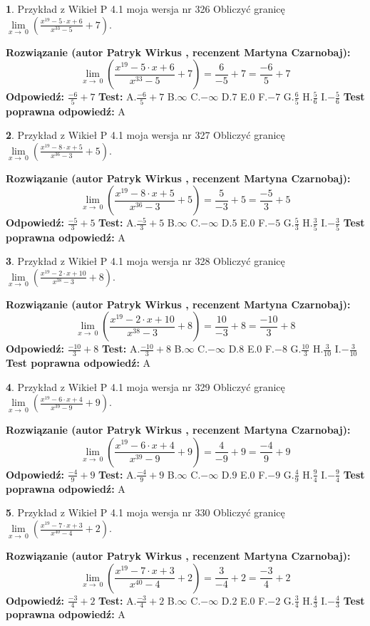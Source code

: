 \documentclass[12pt, a4paper]{article}
\theoremstyle{definition} %
\newtheorem{zad}{}
\newcommand{\zadStart}[1]{\begin{zad}#1\newline}
\newcommand{\zadStop}{\end{zad}}
\newcommand{\rozwStart}[2]{\noindent \textbf{Rozwiązanie (autor #1 , recenzent #2): }\newline}
\newcommand{\rozwStop}{\newline}
\newcommand{\odpStart}{\noindent \textbf{Odpowiedź:}\newline}
\newcommand{\odpStop}{\newline}
\newcommand{\testStart}{\noindent \textbf{Test:}\newline}
\newcommand{\testStop}{\newline}
\newcommand{\kluczStart}{\noindent \textbf{Test poprawna odpowiedź:}\newline}
\newcommand{\kluczStop}{\newline}
\begin{document}
\zadStart{Przykład z Wikieł P 4.1 moja wersja nr 326}
Obliczyć granicę $\lim\limits_{x\to\ 0}(\frac{x^{19}-5 \cdot x +6}{x^{33}-5}+7)$.
\zadStop
\rozwStart{Patryk Wirkus}{Martyna Czarnobaj}
$$\lim\limits_{x\to\ 0}(\frac{x^{19}-5 \cdot x +6}{x^{33}-5}+7)=\frac{6}{-5}+7=\frac{-6}{5}+7$$
\rozwStop
\odpStart
$\frac{-6}{5}+7$
\odpStop
\testStart
A.$\frac{-6}{5}+7$
B.$\infty$
C.$-\infty$
D.$7$
E.$0$
F.$-7$
G.$\frac{6}{5}$
H.$\frac{5}{6}$
I.$-\frac{5}{6}$
\testStop
\kluczStart
A
\kluczStop



\zadStart{Przykład z Wikieł P 4.1 moja wersja nr 327}
Obliczyć granicę $\lim\limits_{x\to\ 0}(\frac{x^{19}-8 \cdot x +5}{x^{36}-3}+5)$.
\zadStop
\rozwStart{Patryk Wirkus}{Martyna Czarnobaj}
$$\lim\limits_{x\to\ 0}(\frac{x^{19}-8 \cdot x +5}{x^{36}-3}+5)=\frac{5}{-3}+5=\frac{-5}{3}+5$$
\rozwStop
\odpStart
$\frac{-5}{3}+5$
\odpStop
\testStart
A.$\frac{-5}{3}+5$
B.$\infty$
C.$-\infty$
D.$5$
E.$0$
F.$-5$
G.$\frac{5}{3}$
H.$\frac{3}{5}$
I.$-\frac{3}{5}$
\testStop
\kluczStart
A
\kluczStop



\zadStart{Przykład z Wikieł P 4.1 moja wersja nr 328}
Obliczyć granicę $\lim\limits_{x\to\ 0}(\frac{x^{19}-2 \cdot x +10}{x^{38}-3}+8)$.
\zadStop
\rozwStart{Patryk Wirkus}{Martyna Czarnobaj}
$$\lim\limits_{x\to\ 0}(\frac{x^{19}-2 \cdot x +10}{x^{38}-3}+8)=\frac{10}{-3}+8=\frac{-10}{3}+8$$
\rozwStop
\odpStart
$\frac{-10}{3}+8$
\odpStop
\testStart
A.$\frac{-10}{3}+8$
B.$\infty$
C.$-\infty$
D.$8$
E.$0$
F.$-8$
G.$\frac{10}{3}$
H.$\frac{3}{10}$
I.$-\frac{3}{10}$
\testStop
\kluczStart
A
\kluczStop



\zadStart{Przykład z Wikieł P 4.1 moja wersja nr 329}
Obliczyć granicę $\lim\limits_{x\to\ 0}(\frac{x^{19}-6 \cdot x +4}{x^{39}-9}+9)$.
\zadStop
\rozwStart{Patryk Wirkus}{Martyna Czarnobaj}
$$\lim\limits_{x\to\ 0}(\frac{x^{19}-6 \cdot x +4}{x^{39}-9}+9)=\frac{4}{-9}+9=\frac{-4}{9}+9$$
\rozwStop
\odpStart
$\frac{-4}{9}+9$
\odpStop
\testStart
A.$\frac{-4}{9}+9$
B.$\infty$
C.$-\infty$
D.$9$
E.$0$
F.$-9$
G.$\frac{4}{9}$
H.$\frac{9}{4}$
I.$-\frac{9}{4}$
\testStop
\kluczStart
A
\kluczStop



\zadStart{Przykład z Wikieł P 4.1 moja wersja nr 330}
Obliczyć granicę $\lim\limits_{x\to\ 0}(\frac{x^{19}-7 \cdot x +3}{x^{40}-4}+2)$.
\zadStop
\rozwStart{Patryk Wirkus}{Martyna Czarnobaj}
$$\lim\limits_{x\to\ 0}(\frac{x^{19}-7 \cdot x +3}{x^{40}-4}+2)=\frac{3}{-4}+2=\frac{-3}{4}+2$$
\rozwStop
\odpStart
$\frac{-3}{4}+2$
\odpStop
\testStart
A.$\frac{-3}{4}+2$
B.$\infty$
C.$-\infty$
D.$2$
E.$0$
F.$-2$
G.$\frac{3}{4}$
H.$\frac{4}{3}$
I.$-\frac{4}{3}$
\testStop
\kluczStart
A
\kluczStop
\end{document}
